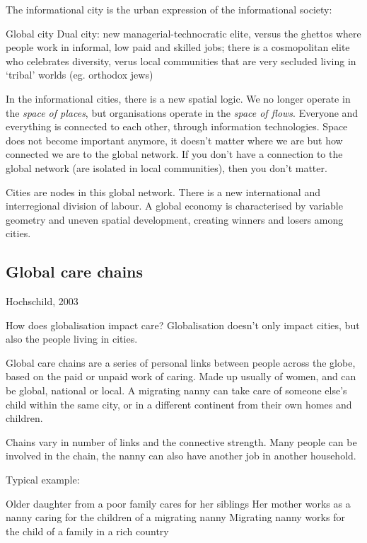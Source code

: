 \documentclass{article}
\begin{document}
The informational city is the urban expression of the informational society:
\begin{outline}
	\1 Global city
	\1 Dual city: new managerial-technocratic elite, versus the ghettos where people work in informal, low paid and skilled jobs; there is a cosmopolitan elite who celebrates diversity, verus local communities that are very secluded living in `tribal' worlds (eg. orthodox jews)
\end{outline}

In the informational cities, there is a new spatial logic. We no longer operate in the \textit{space of places}, but organisations operate in the \textit{space of flows}. Everyone and everything is connected to each other, through information technologies. Space does not become important anymore, it doesn't matter where we are but how connected we are to the global network. If you don't have a connection to the global network (are isolated in local communities), then you don't matter.

Cities are nodes in this global network. There is a new international and interregional division of labour. A global economy is characterised by variable geometry and uneven spatial development, creating winners and losers among cities. 

\subsection{Global care chains}

Hochschild, 2003 

How does globalisation impact care? Globalisation doesn't only impact cities, but also the people living in cities.

Global care chains are a series of personal links between people across the globe, based on the paid or unpaid work of caring. Made up usually of women, and can be global, national or local. A migrating nanny can take care of someone else's child within the same city, or in a different continent from their own homes and children.

Chains vary in number of links and the connective strength. Many people can be involved in the chain, the nanny can also have another job in another household. 

Typical example:
\begin{outline}
	\1 Older daughter from a poor family cares for her siblings
	\1 Her mother works as a nanny caring for the children of a migrating nanny
	\1 Migrating nanny works for the child of a family in a rich country
\end{outline}
\end{document}
